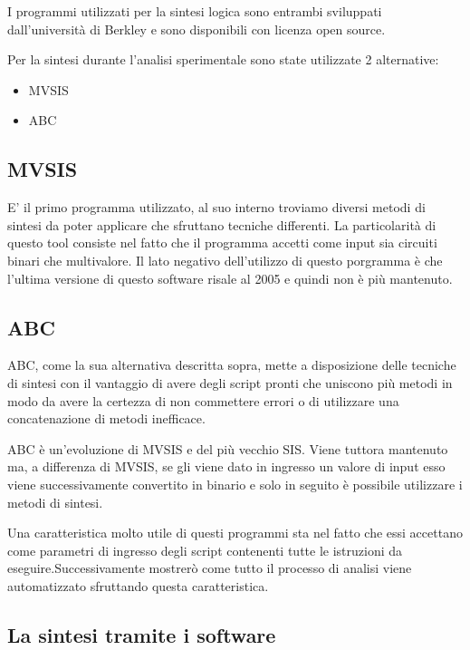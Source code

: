 \documentclass[
  italian,
]{book}
\providecommand{\tightlist}{%
  \setlength{\itemsep}{0pt}\setlength{\parskip}{0pt}}
\begin{document}
I programmi utilizzati per la sintesi logica sono entrambi sviluppati dall'università di Berkley e sono disponibili con licenza open source.

Per la sintesi durante l'analisi sperimentale sono state utilizzate 2 alternative:

\begin{itemize}
\tightlist
\item
  MVSIS
\item
  ABC
\end{itemize}

\hypertarget{mvsis-1}{%
\subsection{MVSIS}\label{mvsis-1}}

E' il primo programma utilizzato, al suo interno troviamo diversi metodi di sintesi da poter applicare che sfruttano tecniche differenti. La particolarità di questo tool consiste nel fatto che il programma accetti come input sia circuiti binari che multivalore. Il lato negativo dell'utilizzo di questo porgramma è che l'ultima versione di questo software risale al 2005 e quindi non è più mantenuto.

\hypertarget{abc-1}{%
\subsection{ABC}\label{abc-1}}

ABC, come la sua alternativa descritta sopra, mette a disposizione delle tecniche di sintesi con il vantaggio di avere degli script pronti che uniscono più metodi in modo da avere la certezza di non commettere errori o di utilizzare una concatenazione di metodi inefficace.

ABC è un'evoluzione di MVSIS e del più vecchio SIS. Viene tuttora mantenuto ma, a differenza di MVSIS, se gli viene dato in ingresso un valore di input esso viene successivamente convertito in binario e solo in seguito è possibile utilizzare i metodi di sintesi.

Una caratteristica molto utile di questi programmi sta nel fatto che essi accettano come parametri di ingresso degli script contenenti tutte le istruzioni da eseguire.Successivamente mostrerò come tutto il processo di analisi viene automatizzato sfruttando questa caratteristica.

\newpage

\hypertarget{la-sintesi-tramite-i-software}{%
\subsection{La sintesi tramite i software}\label{la-sintesi-tramite-i-software}}
\end{document}
